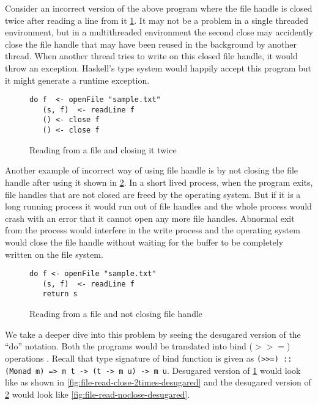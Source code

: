 Consider an incorrect version of the above program where the file handle is closed twice after reading a line from it \cref{fig:file-read-close-2times}.
It may not be a problem in a single threaded environment, but in a multithreaded environment
the second close may accidently close the file handle that may have been reused in the background by another thread.
When another thread tries to write on this closed file handle, it would throw an exception.
Haskell's type system would happily accept this program but it might generate a runtime exception.
\begin{figure}[h]
  \begin{framed}
    \begin{verbatim}
do f  <- openFile "sample.txt"
   (s, f)  <- readLine f
   () <- close f
   () <- close f
    \end{verbatim}
  \end{framed}
  \caption{Reading from a file and closing it twice}
  \label{fig:file-read-close-2times}
\end{figure}

Another example of incorrect way of using file handle is by not closing the file handle after using it shown in \cref{fig:file-read-noclose}.
In a short lived process, when the program exits, file handles that are not closed are freed by the operating system.
But if it is a long running process it would run out of file handles and the whole process would crash with an error that
it cannot open any more file handles. Abnormal exit from the process would interfere in the write process
and the operating system would close the file handle without waiting for the buffer to be completely
written on the file system.
\begin{figure}[h]
  \begin{framed}
    \begin{verbatim}
do f <- openFile "sample.txt"
   (s, f)  <- readLine f
   return s
    \end{verbatim}
  \end{framed}
  \caption{Reading from a file and not closing file handle}
  \label{fig:file-read-noclose}
\end{figure}
We take a deeper dive into this problem by seeing the desugared version of the ``do'' notation.
Both the programs would be translated into bind ($>>=$) operations . Recall that type signature of bind function is given as
\texttt{(>>=) :: (Monad m) => m t -> (t -> m u) -> m u}. Desugared version of \cref{fig:file-read-close-2times}
would look like as shown in \cref{fig:file-read-close-2times-desugared}
and the desugared version of \cref{fig:file-read-noclose} would look like \cref{fig:file-read-noclose-desugared}.

